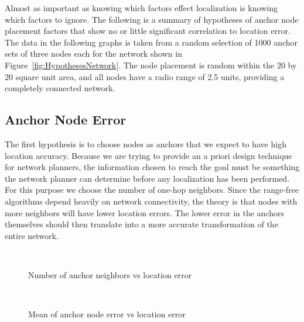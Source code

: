 Almost as important as knowing which factors effect localization is knowing which factors to ignore. The following is a summary of hypotheses of anchor node placement factors that show no or little significant correlation to location error.  The data in the following graphs is taken from a random selection of 1000 anchor sets of three nodes each for the network shown in Figure~\ref{fig:HypothesesNetwork}.  The node placement is random within the 20 by 20 square unit area, and all nodes have a radio range of 2.5 units, providing a completely connected network.

\subsection{Anchor Node Error}
The first hypothesis is to choose nodes as anchors that we expect to have high location accuracy. Because we are trying to provide an a priori design technique for network planners, the information chosen to reach the goal must be something the network planner can determine before any localization has been performed.  For this purpose we choose the number of one-hop neighbors.  Since the range-free algorithms depend heavily on network connectivity, the theory is that nodes with more neighbors will have lower location errors.  The lower error in the anchors themselves should then translate into a more accurate transformation of the entire network.

\begin{figure}
  \centering
\\
	\caption{Number of anchor neighbors vs location error}
	\label{fig:NumberOfAnchorNeighbors}
\end{figure}
\begin{figure}
  \centering
\\
	\caption{Mean of anchor node error vs location error}
	\label{fig:MeanAnchorError}
\end{figure}

